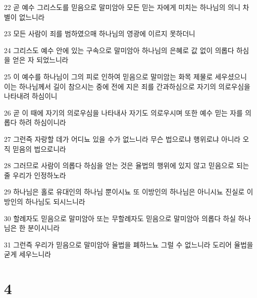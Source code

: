 \par 22 곧 예수 그리스도를 믿음으로 말미암아 모든 믿는 자에게 미치는 하나님의 의니 차별이 없느니라
\par 23 모든 사람이 죄를 범하였으매 하나님의 영광에 이르지 못하더니
\par 24 그리스도 예수 안에 있는 구속으로 말미암아 하나님의 은혜로 값 없이 의롭다 하심을 얻은 자 되었느니라
\par 25 이 예수를 하나님이 그의 피로 인하여 믿음으로 말미암는 화목 제물로 세우셨으니 이는 하나님께서 길이 참으시는 중에 전에 지은 죄를 간과하심으로 자기의 의로우심을 나타내려 하심이니
\par 26 곧 이 때에 자기의 의로우심을 나타내사 자기도 의로우시며 또한 예수 믿는 자를 의롭다 하려 하심이니라
\par 27 그런즉 자랑할 데가 어디뇨 있을 수가 없느니라 무슨 법으로냐 행위로냐 아니라 오직 믿음의 법으로니라
\par 28 그러므로 사람이 의롭다 하심을 얻는 것은 율법의 행위에 있지 않고 믿음으로 되는줄 우리가 인정하노라
\par 29 하나님은 홀로 유대인의 하나님 뿐이시뇨 또 이방인의 하나님은 아니시뇨 진실로 이방인의 하나님도 되시느니라
\par 30 할례자도 믿음으로 말미암아 또는 무할례자도 믿음으로 말미암아 의롭다 하실 하나님은 한 분이시니라
\par 31 그런즉 우리가 믿음으로 말미암아 율법을 폐하느뇨 그럴 수 없느니라 도리어 율법을 굳게 세우느니라

\chapter{4}

